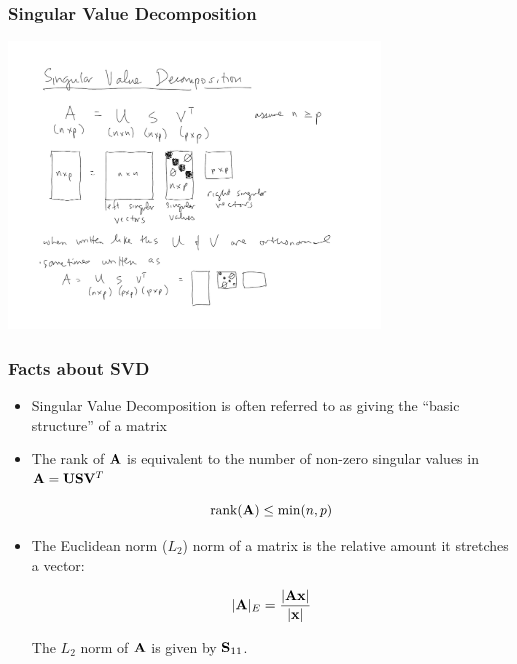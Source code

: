 \documentclass{beamer}
\DeclareMathOperator{\rank}{rank}
\begin{document}
\begin{frame}
  \frametitle{Singular Value Decomposition}



\begin{center}
\includegraphics[height=3in]{svd-graphic}
\end{center}

\end{frame}


\begin{frame}
  \frametitle{Facts about SVD}

\begin{itemize}
\item Singular Value Decomposition is often referred to as giving the ``basic structure'' of a matrix

\item The rank of $\mathbf{A}$ is equivalent to the number of non-zero singular values in $ \mathbf{A} = \mathbf{U}\mathbf{S}\mathbf{V}^T $

$$ \rank(\Mtx{A}) \leq \min(n,p) $$


\item  The Euclidean norm ($L_2$) norm of a matrix is the relative amount it stretches a vector:

$$ |\mathbf{A}|_E = \frac{|\mathbf{A}\mathbf{x}|}{|\mathbf{x}|} $$

The $L_2$ norm of $\mathbf{A}$ is given by $\mathbf{S}_{11}$.
\end{itemize}



\end{frame}
\end{document}
